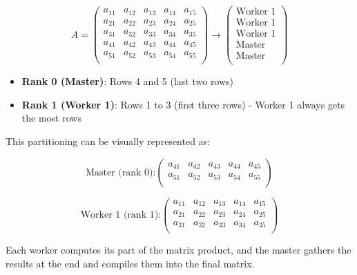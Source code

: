 \begin{tcolorbox}[examplebox, title=Partitioning Example]

\[
A =
\begin{pmatrix}
    a_{11} & a_{12} & a_{13} & a_{14} & a_{15} \\
    a_{21} & a_{22} & a_{23} & a_{24} & a_{25} \\
    a_{31} & a_{32} & a_{33} & a_{34} & a_{35} \\
    a_{41} & a_{42} & a_{43} & a_{44} & a_{45} \\
    a_{51} & a_{52} & a_{53} & a_{54} & a_{55} \\
\end{pmatrix} \rightarrow
\begin{pmatrix}
    \text{Worker 1} \\
    \text{Worker 1} \\
    \text{Worker 1} \\
    \text{Master} \\
    \text{Master} \\
\end{pmatrix}
\]

\begin{itemize}
    \item \textbf{Rank 0 (Master)}: Rows 4 and 5 (last two rows)
    \item \textbf{Rank 1 (Worker 1)}: Rows 1 to 3 (first three rows) - Worker 1 always gets the most rows
\end{itemize}

This partitioning can be visually represented as:

\[
\text{Master (rank 0):}
\begin{pmatrix}
    a_{41} & a_{42} & a_{43} & a_{44} & a_{45} \\
    a_{51} & a_{52} & a_{53} & a_{54} & a_{55} \\
\end{pmatrix}
\]

\[
\text{Worker 1 (rank 1):}
\begin{pmatrix}
    a_{11} & a_{12} & a_{13} & a_{14} & a_{15} \\
    a_{21} & a_{22} & a_{23} & a_{24} & a_{25} \\
    a_{31} & a_{32} & a_{33} & a_{34} & a_{35} \\
\end{pmatrix}
\]

\end{tcolorbox}
Each worker computes its part of the matrix product, and the master gathers the results at the end and compiles them into the final matrix.

